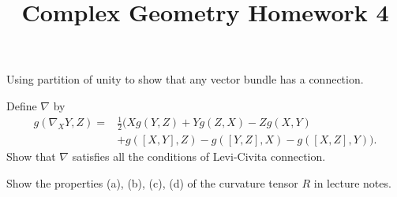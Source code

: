 \documentclass[12pt]{article}
\title{Complex Geometry Homework 4}
\author{}
\date{}
\begin{document}
\maketitle
\begin{problem}
    Using partition of unity to show that any vector bundle has a connection.
\end{problem}
\begin{problem}
    Define \(\nabla\) by
    \begin{align*}
        g(\nabla_X Y,Z)=&\frac{1}{2}\big(Xg(Y,Z)+Yg(Z,X)-Zg(X,Y) \\
        &+g([X,Y],Z)-g([Y,Z],X)-g([X,Z],Y)\big)
    .\end{align*}
    Show that \(\nabla\) satisfies all the conditions of Levi-Civita connection.
\end{problem}
\begin{problem}
    Show the properties (a), (b), (c), (d) of the curvature tensor \(R\) in lecture
    notes.
\end{problem}
\end{document}
